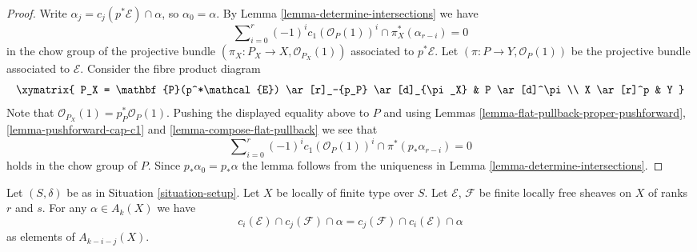 \begin{proof}
Write $\alpha_j = c_j(p^*\mathcal{E}) \cap \alpha$, so $\alpha_0 = \alpha$.
By Lemma \ref{lemma-determine-intersections} we have
$$
\sum\nolimits_{i = 0}^r
(-1)^i c_1(\mathcal{O}_P(1))^i \cap
\pi_X^*(\alpha_{r - i}) = 0
$$
in the chow group of the projective bundle
$(\pi_X : P_X \to X, \mathcal{O}_{P_X}(1))$
associated to $p^*\mathcal{E}$. Let
$(\pi : P \to Y, \mathcal{O}_P(1))$
be the projective bundle associated to $\mathcal{E}$.
Consider the fibre product diagram
$$
\xymatrix{
P_X = \mathbf{P}(p^*\mathcal{E}) \ar[r]_-{p_P} \ar[d]_{\pi_X} &
P \ar[d]^\pi \\
X \ar[r]^p & Y
}
$$
Note that $\mathcal{O}_{P_X}(1) = p_P^*\mathcal{O}_P(1)$.
Pushing the displayed equality above to $P$ and using
Lemmas \ref{lemma-flat-pullback-proper-pushforward},
\ref{lemma-pushforward-cap-c1} and
\ref{lemma-compose-flat-pullback} we see that
$$
\sum\nolimits_{i = 0}^r
(-1)^i c_1(\mathcal{O}_P(1))^i \cap
\pi^*(p_*\alpha_{r - i}) = 0
$$
holds in the chow group of $P$. Since $p_*\alpha_0 = p_*\alpha$
the lemma follows from
the uniqueness in Lemma \ref{lemma-determine-intersections}.
\end{proof}

\begin{lemma}
\label{lemma-cap-commutative-chern}
Let $(S, \delta)$ be as in Situation \ref{situation-setup}.
Let $X$ be locally of finite type over $S$.
Let $\mathcal{E}$, $\mathcal{F}$ be finite locally free sheaves on $X$
of ranks $r$ and $s$.
For any $\alpha \in A_k(X)$ we have
$$
c_i(\mathcal{E}) \cap c_j(\mathcal{F}) \cap \alpha
=
c_j(\mathcal{F}) \cap c_i(\mathcal{E}) \cap \alpha
$$
as elements of $A_{k - i - j}(X)$.
\end{lemma}

